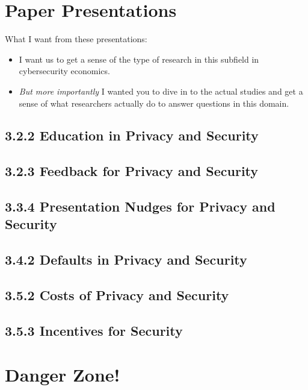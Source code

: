 \documentclass[11pt]{article}
\begin{document}

\section{Paper Presentations}

What I want from these presentations:
\begin{itemize}
    \item I want us to get a sense of the type of research in this subfield in cybersecurity economics.
    \item {\it But more importantly} I wanted you to dive in to the actual studies and get a sense of what researchers actually do to answer questions in this domain.
\end{itemize}

\subsection{3.2.2 Education in Privacy and Security}
\subsection{3.2.3 Feedback for Privacy and Security}
\subsection{3.3.4 Presentation Nudges for Privacy and Security}
\subsection{3.4.2 Defaults in Privacy and Security}
\subsection{3.5.2 Costs of Privacy and Security}
\subsection{3.5.3 Incentives for Security}


\section{Danger Zone!}
\end{document}
